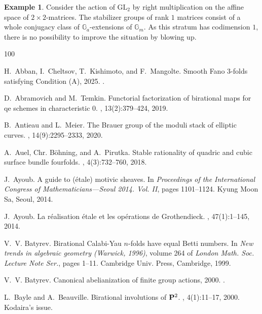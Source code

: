 \documentclass[12pt,reqno]{amsart}
\theoremstyle{plain}
\theoremstyle{remark}
\theoremstyle{definition}
\newtheorem{exam}[prop]{Example}
\numberwithin{equation}{section}
\newcommand{\G}{{\mathbb G}}
\newcommand{\GL}{{\mathrm{GL}}}
\begin{document}
\begin{exam}
\label{exa.GL2}
Consider the action of $\GL_2$ by right multiplication on the affine space of $2\times 2$-matrices.
The stabilizer groups of
rank $1$ matrices consist of a whole conjugacy class of $\G_a$-extensions of $\G_m$.
As this stratum has codimension $1$,
there is no possibility to improve the situation by blowing up.
\end{exam}

\begin{thebibliography}{100}

H.~Abban, I.~Cheltsov, T.~Kishimoto, and F.~Mangolte.
\newblock Smooth {F}ano 3-folds satisfying {C}ondition {(A)}, 2025.
.

D.~Abramovich and M.~Temkin.
\newblock Functorial factorization of birational maps for qe schemes in
  characteristic 0.
, 13(2):379--424, 2019.

B.~Antieau and L.~Meier.
\newblock The {B}rauer group of the moduli stack of elliptic curves.
, 14(9):2295--2333, 2020.

A.~Auel, Chr. B\"ohning, and A.~Pirutka.
\newblock Stable rationality of quadric and cubic surface bundle fourfolds.
, 4(3):732--760, 2018.

J.~Ayoub.
\newblock A guide to (\'etale) motivic sheaves.
\newblock In {\em Proceedings of the {I}nternational {C}ongress of
  {M}athematicians---{S}eoul 2014. {V}ol. {II}}, pages 1101--1124. Kyung Moon
  Sa, Seoul, 2014.

J.~Ayoub.
\newblock La r\'ealisation \'etale et les op\'erations de {G}rothendieck.
, 47(1):1--145, 2014.

V.~V. Batyrev.
\newblock Birational {C}alabi-{Y}au {$n$}-folds have equal {B}etti numbers.
\newblock In {\em New trends in algebraic geometry ({W}arwick, 1996)}, volume
  264 of {\em London Math. Soc. Lecture Note Ser.}, pages 1--11. Cambridge
  Univ. Press, Cambridge, 1999.

V.~V. Batyrev.
\newblock Canonical abelianization of finite group actions, 2000.
.

L.~Bayle and A.~Beauville.
\newblock Birational involutions of {${\bf P}^2$}.
, 4(1):11--17, 2000.
\newblock Kodaira's issue.


\end{thebibliography}
\end{document}
